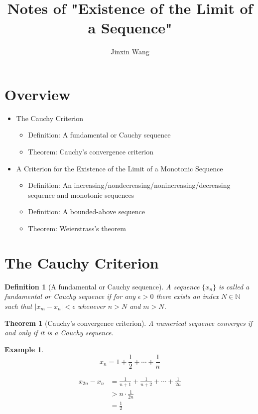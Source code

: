 \documentclass[onecolumn]{ctexart}
\title{Notes of "Existence of the Limit of a Sequence"}
\author{Jinxin Wang}
\date{}
\newtheorem{definition}{Definition}
\newtheorem{theorem}{Theorem}
\newtheorem{example}{Example}
\begin{document}
\maketitle

\section{Overview}

\begin{itemize}
  \item The Cauchy Criterion
  \begin{itemize}
    \item Definition: A fundamental or Cauchy sequence
    \item Theorem: Cauchy's convergence criterion
  \end{itemize}
  \item A Criterion for the Existence of the Limit of a Monotonic Sequence
  \begin{itemize}
    \item Definition: An increasing/nondecreasing/nonincreasing/decreasing sequence and monotonic sequences
    \item Definition: A bounded-above sequence
    \item Theorem: Weierstrass's theorem
  \end{itemize}
\end{itemize}

\section{The Cauchy Criterion}

\begin{definition}[A fundamental or Cauchy sequence]
  A sequence $\lbrace x_n \rbrace$ is called a fundamental or Cauchy sequence if 
  for any $\epsilon > 0$ there exists an index $N \in \mathbb{N}$ such that 
  $|x_m - x_n| < \epsilon$ whenever $n > N$ and $m > N$.
\end{definition}

\begin{theorem}[Cauchy's convergence criterion]
  A numerical sequence converges if and only if it is a Cauchy sequence.
\end{theorem}

\begin{example}
  \[
    x_n = 1 + \frac{1}{2} + \cdots + \frac{1}{n}
  \]

  \[
    \begin{split}
      x_{2n} - x_{n} &= \frac{1}{n+1} + \frac{1}{n+2} + \cdots + \frac{1}{2n} \\
                     &> n \cdot \frac{1}{2n} \\
                     &= \frac{1}{2}
    \end{split}
  \]
\end{example}
\end{document}
